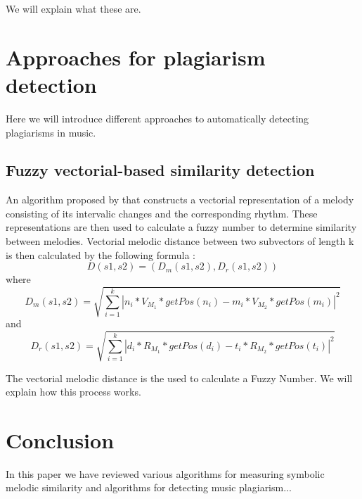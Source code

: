 \documentclass{article}
\begin{document}
					We will explain what these are.




	\section{Approaches for plagiarism detection}
	
        Here we will introduce different approaches to automatically detecting plagiarisms in music.
	
        \subsection{Fuzzy vectorial-based similarity detection}
            An algorithm proposed by \cite{five} that constructs a vectorial representation of a melody consisting of its intervalic changes and the corresponding rhythm. These representations are then used to calculate a fuzzy number to determine similarity between melodies. 
            Vectorial melodic distance between two subvectors of length k  is then calculated by the following formula : 
            \begin{equation}
                D(s1,s2)=(D_m(s1,s2),D_r(s1,s2))
            \end{equation}
            where
            \begin{equation}
             D_m(s1,s2) = \sqrt{\sum_{i=1}^k |n_i * V_{M_1} * getPos(n_i) - m_i * V_{M_2} * getPos(m_i)|^2}
            \end{equation}
            and
            \begin{equation}
               D_r(s1,s2) = \sqrt{\sum_{i=1}^k |d_i * R_{M_1} * getPos(d_i) - t_i * R_{M_2} * getPos(t_i)|^2}
            \end{equation}
            
            The vectorial melodic distance is the used to calculate a Fuzzy Number. We will explain how this process works.



            
        
        
			

	\section*{Conclusion}

		In this paper we have reviewed various algorithms for measuring symbolic melodic similarity and algorithms for detecting music plagiarism...
\end{document}
